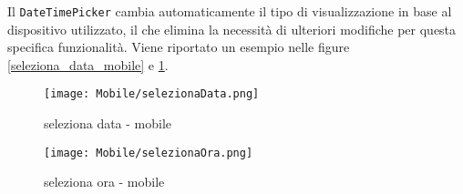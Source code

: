 \clearpage
\noindent Il \texttt{DateTimePicker} cambia automaticamente il tipo di visualizzazione in base al dispositivo utilizzato, 
il che elimina la necessità di ulteriori modifiche per questa specifica funzionalità. Viene riportato un esempio
nelle figure \ref{seleziona_data_mobile} e \ref{seleziona_ora_mobile}.
\begin{figure}[H]
    \centering
    \begin{minipage}{0.45\textwidth}
        \centering
        \texttt{[image: Mobile/selezionaData.png]}
        \caption{seleziona data - mobile}
        \label{seleziona_data_mobile}
    \end{minipage}
    \hspace{0.05\textwidth}
    \begin{minipage}{0.45\textwidth}
        \centering
        \texttt{[image: Mobile/selezionaOra.png]}
        \caption{seleziona ora - mobile}
        \label{seleziona_ora_mobile}
    \end{minipage}
\end{figure}